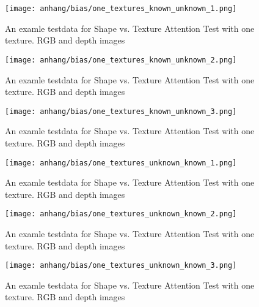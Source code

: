 	\begin{figure}[H]
		\centering
		\texttt{[image: anhang/bias/one\_textures\_known\_unknown\_1.png]}
		\caption[An examle testdata for Shape vs. Texture Attention Test with one texture. RGB and depth images]{An examle testdata for Shape vs. Texture Attention Test with one texture. RGB and depth images}
	\end{figure}
	\begin{figure}[H]
		\centering
		\texttt{[image: anhang/bias/one\_textures\_known\_unknown\_2.png]}
		\caption[An examle testdata for Shape vs. Texture Attention Test with one texture. RGB and depth images]{An examle testdata for Shape vs. Texture Attention Test with one texture. RGB and depth images}
	\end{figure}
	\begin{figure}[H]
		\centering
		\texttt{[image: anhang/bias/one\_textures\_known\_unknown\_3.png]}
		\caption[An examle testdata for Shape vs. Texture Attention Test with one texture. RGB and depth images]{An examle testdata for Shape vs. Texture Attention Test with one texture. RGB and depth images}
	\end{figure}
	
	\begin{figure}[H]
		\centering
		\texttt{[image: anhang/bias/one\_textures\_unknown\_known\_1.png]}
		\caption[An examle testdata for Shape vs. Texture Attention Test with one texture. RGB and depth images]{An examle testdata for Shape vs. Texture Attention Test with one texture. RGB and depth images}
	\end{figure}
	\begin{figure}[H]
		\centering
		\texttt{[image: anhang/bias/one\_textures\_unknown\_known\_2.png]}
		\caption[An examle testdata for Shape vs. Texture Attention Test with one texture. RGB and depth images]{An examle testdata for Shape vs. Texture Attention Test with one texture. RGB and depth images}
	\end{figure}
	\begin{figure}[H]
		\centering
		\texttt{[image: anhang/bias/one\_textures\_unknown\_known\_3.png]}
		\caption[An examle testdata for Shape vs. Texture Attention Test with one texture. RGB and depth images]{An examle testdata for Shape vs. Texture Attention Test with one texture. RGB and depth images}
	\end{figure}
	
